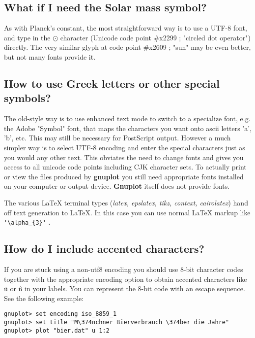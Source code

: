 \documentclass[a4paper,11pt]{article}
\newcommand{\gnuplot}{\textbf{gnuplot }}
\newcommand{\Gnuplot}{\textbf{Gnuplot }}
\begin{document}
\subsection{What if I need the Solar mass symbol?}

As with Planck's constant, the most straightforward way is to use a
UTF-8 font, and type in the $\odot$ character (Unicode code point \#x2299 ; "circled dot operator") directly.
The very similar glyph at code point \#x2609 ; "sun" may be even better, but not many fonts provide it.

\subsection{How to use Greek letters or other special symbols?}

The old-style way is to use enhanced text mode to switch to a specialize font,
e.g. the Adobe "Symbol" font, that maps the characters you want onto ascii
letters 'a', 'b', etc.  This may still be necessary for PostScript output.
However a much simpler way is to select UTF-8 encoding and enter the
special characters just as you would any other text.
This obviates the need to change fonts and gives you access to all unicode
code points including CJK character sets.  To actually print or view the
files produced by \gnuplot you still need appropriate fonts installed on
your computer or output device.  \Gnuplot itself does not provide fonts.

The various \LaTeX{} terminal types (\textit{latex, epslatex, tikz, context, cairolatex})
hand off text generation to \LaTeX{}. In this case you can use normal \LaTeX{}
markup like \verb+'\alpha_{3}'+ .

\subsection{How do I include accented characters?}

If you are stuck using a non-utf8 encoding you should use
8-bit character codes together with the appropriate encoding option
to obtain accented characters like \"u or \^n in your labels.
You can represent the 8-bit code with an escape sequence.
See the following example:

\small
\begin{verbatim}
gnuplot> set encoding iso_8859_1
gnuplot> set title "M\374nchner Bierverbrauch \374ber die Jahre"
gnuplot> plot "bier.dat" u 1:2
\end{verbatim}
\normalsize
\end{document}
